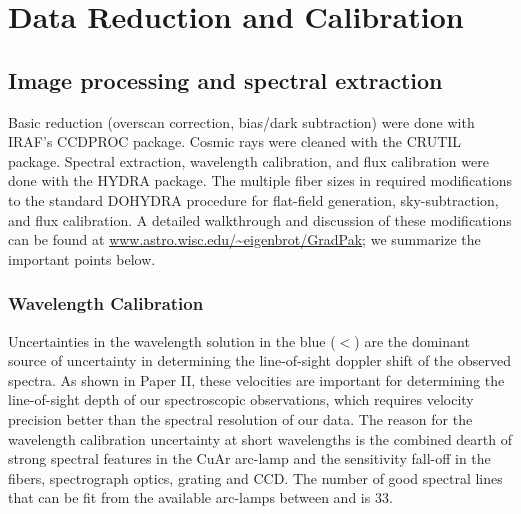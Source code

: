 \section{Data Reduction and Calibration}
\label{891_1:sec:data_reduction}

\subsection{Image processing and spectral extraction}

Basic reduction (overscan correction, bias/dark subtraction) were done
with IRAF's CCDPROC package. Cosmic rays were cleaned with the CRUTIL
package. Spectral extraction, wavelength calibration, and flux
calibration were done with the HYDRA package. The multiple fiber sizes
in \GP required modifications to the standard DOHYDRA procedure for
flat-field generation, sky-subtraction, and flux calibration. A
detailed walkthrough and discussion of these modifications can be
found at \url{www.astro.wisc.edu/~eigenbrot/GradPak}; we summarize the
important points below.

\subsubsection{Wavelength Calibration}
\label{891_1:sec:wavecal}

Uncertainties in the wavelength solution in the blue
($<$) are the dominant source of uncertainty in
determining the line-of-sight doppler shift of the observed
spectra. As shown in Paper II, these velocities are important for
determining the line-of-sight depth of our spectroscopic observations,
which requires velocity precision better than the spectral resolution
of our data.
The reason for the wavelength calibration uncertainty
at short wavelengths is the combined dearth of strong spectral
features in the CuAr arc-lamp and the sensitivity fall-off in the
fibers, spectrograph optics, grating and CCD. The number of good
spectral lines that can be fit from the available arc-lamps between
 and  is 33.

